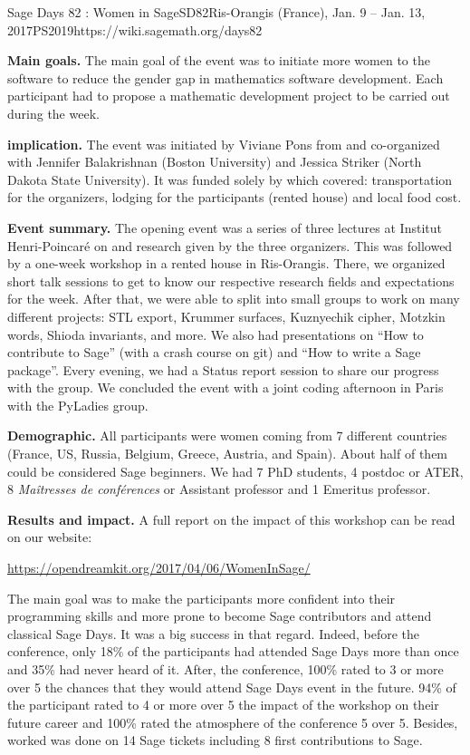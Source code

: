 \begin{event}{Sage Days 82 : Women in Sage}{SD82}{Ris-Orangis (France), Jan. 9 -- Jan. 13, 2017}{PS}{20}{19}{https://wiki.sagemath.org/days82}

\textbf{Main goals.} The main goal of the event was to initiate more women to the software \Sage to reduce the gender gap in mathematics software
development. Each participant had to propose a mathematic development project to be carried out during the week.

\textbf{\ODK implication.} The event was initiated by Viviane Pons from \ODK and co-organized with Jennifer Balakrishnan (Boston University) and Jessica Striker (North Dakota State University). It was funded solely by \ODK which covered: transportation for the organizers, lodging for the participants (rented house) and local food cost.

\textbf{Event summary.} The opening event was a series of three lectures at Institut Henri-Poincaré on \Sage and research given by the three organizers. This was followed by a one-week workshop in a rented house in Ris-Orangis. There, we organized short talk sessions to get to know our respective research fields and expectations for the week. After that, we were able to split into small groups to work on many different projects: STL export, Krummer surfaces, Kuznyechik cipher, Motzkin words, Shioda invariants, and more. We also had presentations on ``How to contribute to Sage'' (with a crash course on git) and ``How to write a Sage package''. Every evening, we had a Status report session to share our progress with the group. We concluded the event with a joint coding afternoon in Paris with the PyLadies group.

\textbf{Demographic.} All participants were women coming from 7 different countries (France, US, Russia, Belgium, Greece, Austria, and Spain). About half of them could be considered Sage beginners. We had 7 PhD students, 4 postdoc or ATER, 8 \textit{Maîtresses de conférences} or Assistant professor and 1 Emeritus professor.

\textbf{Results and impact.} A full report on the impact of this
workshop can be read on our website:
\centerline{\url{https://opendreamkit.org/2017/04/06/WomenInSage/}}
The main goal was to make the participants more confident into their programming skills and more prone to become Sage contributors and attend classical Sage Days. It was a big success in that regard. Indeed, before the conference, only 18\% of the participants had attended Sage Days more than once and 35\% had never heard of it. After, the conference, 100\% rated to 3 or more over 5 the chances that they would attend Sage Days event in the future. 94\% of the participant rated to 4 or more over 5 the impact of the workshop on their future career and 100\% rated the atmosphere of the conference 5 over 5. Besides, worked was done on 14 Sage tickets including 8 first contributions to Sage.


\end{event}
